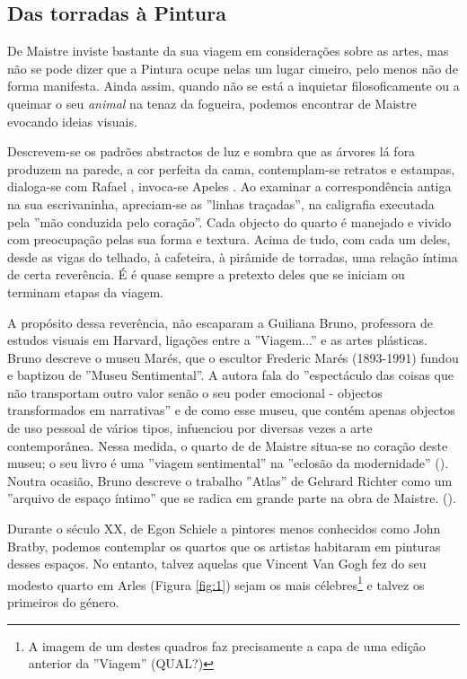 \documentclass[12pt]{article}
\begin{document}
\subsection{Das torradas à Pintura}

De Maistre inviste bastante da sua viagem em considerações sobre as
artes, mas não se pode dizer que a Pintura ocupe nelas um lugar
cimeiro, pelo menos não de forma manifesta. Ainda assim, quando não se
está a inquietar filosoficamente ou a queimar o seu \emph{animal} na
tenaz da fogueira, podemos encontrar de Maistre evocando ideias
visuais.

Descrevem-se os padrões abstractos de luz e sombra que as árvores lá
fora produzem na parede, a cor perfeita da cama, contemplam-se
retratos e estampas, dialoga-se com Rafael \cite[p.xxx?]{demaistre},
invoca-se Apeles \cite[p.xxx?]{demaistre}. Ao examinar a
correspondência antiga na sua escrivaninha, apreciam-se as ''linhas
traçadas'', na caligrafia executada pela ''mão conduzida pelo
coração''. Cada objecto do quarto é manejado e vivido com preocupação
pelas sua forma e textura. Acima de tudo, com cada um deles, desde as
vigas do telhado, à cafeteira, à pirâmide de torradas, uma relação
íntima de certa reverência. É é quase sempre a pretexto deles que se
iniciam ou terminam etapas da viagem.

A propósito dessa reverência, não escaparam a Guiliana Bruno,
professora de estudos visuais em Harvard, ligações entre a
''Viagem...'' e as artes plásticas. Bruno descreve o museu Marés, que
o escultor Frederic Marés (1893-1991) fundou e baptizou de ''Museu
Sentimental''. A autora fala do ''espectáculo das coisas que não
transportam outro valor senão o seu poder emocional - objectos
transformados em narrativas'' e de como esse museu, que contém apenas
objectos de uso pessoal de vários tipos, infuenciou por diversas vezes
a arte contemporânea. Nessa medida, o quarto de de Maistre situa-se no
coração deste museu; o seu livro é uma ''viagem sentimental'' na
''eclosão da modernidade'' (\cite[p.133]{bruno2002atlas}). Noutra
ocasião, Bruno descreve o trabalho ''Atlas'' de Gehrard Richter como
um ''arquivo de espaço íntimo'' que se radica em grande parte na obra
de Maistre. (\cite[p.254]{bruno2002atlas}).

Durante o século XX, de Egon Schiele a pintores menos conhecidos como
John Bratby, podemos contemplar os quartos que os artistas habitaram
em pinturas desses espaços. No entanto, talvez aquelas que Vincent Van
Gogh fez do seu modesto quarto em Arles (Figura \ref{fig:1}) sejam os
mais célebres\footnote{A imagem de um destes quadros faz precisamente
  a capa de uma edição anterior da ''Viagem'' (QUAL?)} e talvez os
primeiros do género. 
\end{document}
